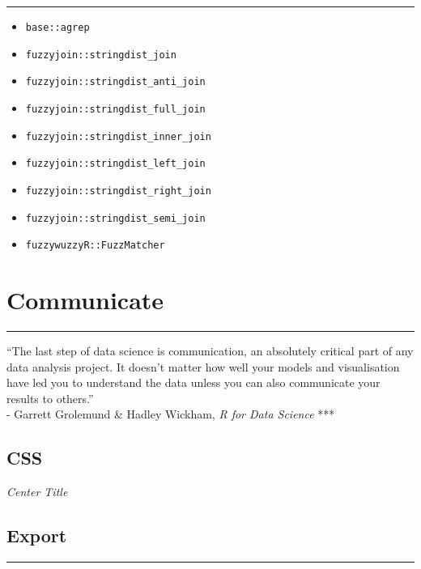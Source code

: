 \documentclass[
]{book}
\providecommand{\tightlist}{%
  \setlength{\itemsep}{0pt}\setlength{\parskip}{0pt}}
\begin{document}
\begin{center}\rule{0.5\linewidth}{0.5pt}\end{center}

\begin{itemize}
\tightlist
\item
  \texttt{base::agrep}
\item
  \texttt{fuzzyjoin::stringdist\_join}
\item
  \texttt{fuzzyjoin::stringdist\_anti\_join}
\item
  \texttt{fuzzyjoin::stringdist\_full\_join}
\item
  \texttt{fuzzyjoin::stringdist\_inner\_join}
\item
  \texttt{fuzzyjoin::stringdist\_left\_join}
\item
  \texttt{fuzzyjoin::stringdist\_right\_join}
\item
  \texttt{fuzzyjoin::stringdist\_semi\_join}
\item
  \texttt{fuzzywuzzyR::FuzzMatcher}
\end{itemize}

\hypertarget{communicate}{%
\chapter{Communicate}\label{communicate}}

\begin{center}\rule{0.5\linewidth}{0.5pt}\end{center}

``The last step of data science is communication, an absolutely critical part of any data analysis project. It doesn't matter how well your models and visualisation have led you to understand the data unless you can also communicate your results to others.''\\
- Garrett Grolemund \& Hadley Wickham, \emph{R for Data Science}
***

\hypertarget{css}{%
\section{CSS}\label{css}}

\emph{Center Title}

\hypertarget{export}{%
\section{Export}\label{export}}

\begin{center}\rule{0.5\linewidth}{0.5pt}\end{center}
\end{document}
